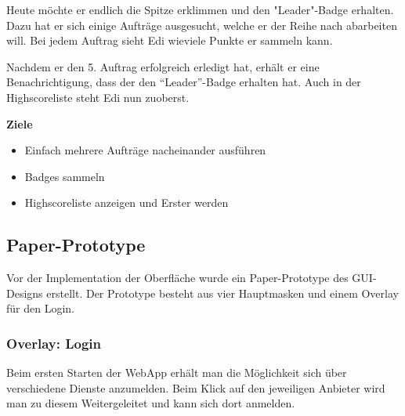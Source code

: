 Heute möchte er endlich die Spitze erklimmen und den "Leader"-Badge erhalten.
Dazu hat er sich einige Aufträge ausgesucht, welche er der Reihe nach abarbeiten will.
Bei jedem Auftrag sieht Edi wieviele Punkte er sammeln kann.

Nachdem er den 5. Auftrag erfolgreich erledigt hat, erhält er eine Benachrichtigung, dass der den "`Leader"'-Badge erhalten hat.
Auch in der Highscoreliste steht Edi nun zuoberst.

\textbf{Ziele}
\begin{itemize}
\item Einfach mehrere Aufträge nacheinander ausführen
\item Badges sammeln
\item Highscoreliste anzeigen und Erster werden
\end{itemize}

\subsection{Paper-Prototype}
\setcounter{subfigure}{0}

Vor der Implementation der Oberfläche wurde ein Paper-Prototype des GUI-Designs erstellt.
Der Prototype besteht aus vier Hauptmasken und einem Overlay für den Login.

\subsubsection{Overlay: Login}
Beim ersten Starten der \gls{WebApp} erhält man die Möglichkeit sich über verschiedene Dienste anzumelden.
Beim Klick auf den jeweiligen Anbieter wird man zu diesem Weitergeleitet und kann sich dort anmelden.

